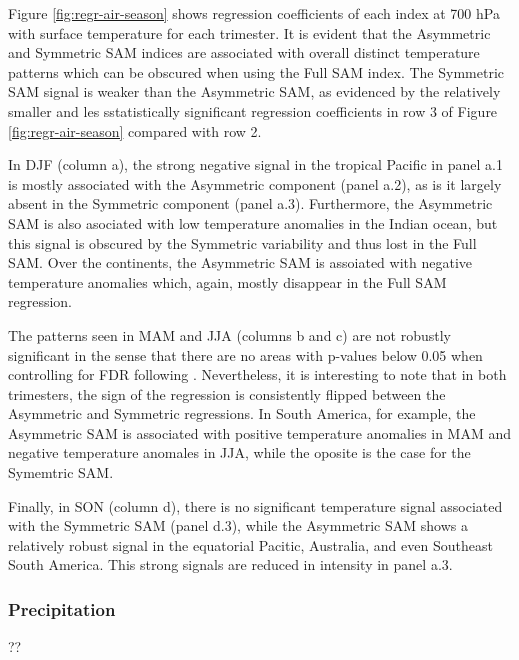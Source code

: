 \documentclass[twocol]{ametsocV5}
\begin{document}
Figure \ref{fig:regr-air-season} shows regression coefficients of each
index at 700 hPa with surface temperature for each trimester. It is
evident that the Asymmetric and Symmetric SAM indices are associated
with overall distinct temperature patterns which can be obscured when
using the Full SAM index. The Symmetric SAM signal is weaker than the
Asymmetric SAM, as evidenced by the relatively smaller and les
sstatistically significant regression coefficients in row 3 of Figure
\ref{fig:regr-air-season} compared with row 2.

In DJF (column a), the strong negative signal in the tropical Pacific in
panel a.1 is mostly associated with the Asymmetric component (panel
a.2), as is it largely absent in the Symmetric component (panel a.3).
Furthermore, the Asymmetric SAM is also asociated with low temperature
anomalies in the Indian ocean, but this signal is obscured by the
Symmetric variability and thus lost in the Full SAM. Over the
continents, the Asymmetric SAM is assoiated with negative temperature
anomalies which, again, mostly disappear in the Full SAM regression.

The patterns seen in MAM and JJA (columns b and c) are not robustly
significant in the sense that there are no areas with p-values below
0.05 when controlling for FDR following \citet{wilks2016}. Nevertheless,
it is interesting to note that in both trimesters, the sign of the
regression is consistently flipped between the Asymmetric and Symmetric
regressions. In South America, for example, the Asymmetric SAM is
associated with positive temperature anomalies in MAM and negative
temperature anomales in JJA, while the oposite is the case for the
Symemtric SAM.

Finally, in SON (column d), there is no significant temperature signal
associated with the Symmetric SAM (panel d.3), while the Asymmetric SAM
shows a relatively robust signal in the equatorial Pacitic, Australia,
and even Southeast South America. This strong signals are reduced in
intensity in panel a.3.

\subsubsection{Precipitation}

??
\end{document}
